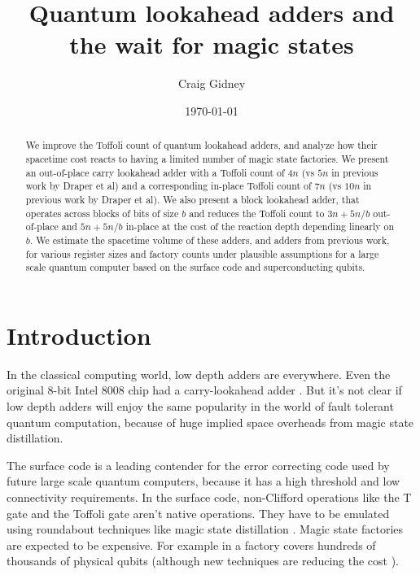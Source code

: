 \documentclass[onecolumn,unpublished]{quantumarticle}
\title{Quantum lookahead adders and the wait for magic states}
\date{\today}
\author{Craig Gidney}
\affiliation{Google Inc., Santa Barbara, California 93117, USA}
\theoremstyle{definition}
\theoremstyle{definition}
\theoremstyle{definition}
\begin{document}
\maketitle

\begin{abstract}
We improve the Toffoli count of quantum lookahead adders, and analyze how their spacetime cost reacts to having a limited number of magic state factories.
We present an out-of-place carry lookahead adder with a Toffoli count of $4n$ (vs $5n$ in previous work by Draper et al) and a corresponding in-place Toffoli count of $7n$ (vs $10n$ in previous work by Draper et al).
We also present a block lookahead adder, that operates across blocks of bits of size $b$ and reduces the Toffoli count to $3n + 5n/b$ out-of-place and $5n + 5n/b$ in-place at the cost of the reaction depth depending linearly on $b$.
We estimate the spacetime volume of these adders, and adders from previous work, for various register sizes and factory counts under plausible assumptions for a large scale quantum computer based on the surface code and superconducting qubits.
\end{abstract}

\section{Introduction}

In the classical computing world, low depth adders are everywhere.
Even the original 8-bit Intel 8008 chip had a carry-lookahead adder \cite{shirriff2020reverseengineer8008}.
But it's not clear if low depth adders will enjoy the same popularity in the world of fault tolerant quantum computation, because of huge implied space overheads from magic state distillation.

The surface code \cite{fowler2012surfacereview} is a leading contender for the error correcting code used by future large scale quantum computers, because it has a high threshold and low connectivity requirements.
In the surface code, non-Clifford operations like the T gate and the Toffoli gate aren't native operations.
They have to be emulated using roundabout techniques like magic state distillation \cite{bravyi2005magicstate}.
Magic state factories are expected to be expensive.
For example in \cite{gidney2019catalyzed} a factory covers hundreds of thousands of physical qubits (although new techniques are reducing the cost \cite{litinski2019magicnotcostly}).
\end{document}
